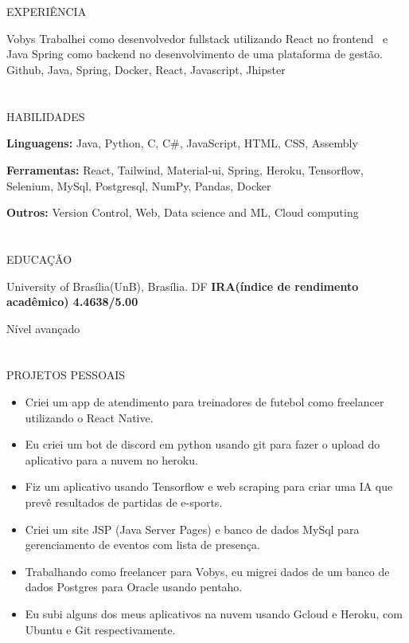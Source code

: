 \documentclass{my_cvPT}
\begin{document}
\begin{multicols}{2}
\section{\faPencil}{EXPERIÊNCIA}
    
%
    {Vobys}%
    {Trabalhei como desenvolvedor fullstack utilizando React no frontend
     \ e Java Spring como backend no desenvolvimento de uma plataforma de gestão.}%
    {Github, Java, Spring, Docker, React, Javascript, Jhipster}
    
\section{\faList}{HABILIDADES}

\textbf{Linguagens:} Java, Python, C, C\#, JavaScript, HTML, CSS, Assembly

\noindent\textbf{Ferramentas:} React, Tailwind, Material-ui, Spring, Heroku, Tensorflow, Selenium, MySql, Postgresql, NumPy, Pandas, Docker

\noindent\textbf{Outros:} Version Control, Web, Data science and ML, Cloud computing

\section{\faGraduationCap}{EDUCAÇÃO}

{University of Brasília(UnB), Brasília. DF} %
{\textbf{IRA(índice de rendimento acadêmico) 4.4638/5.00}}

{Nível avançado} %
{}

\columnbreak

\section{\faPaintBrush}{PROJETOS PESSOAIS}
\begin{itemize}[noitemsep]
    \item Criei um app de atendimento para treinadores de futebol como freelancer utilizando o React Native.
    \item Eu criei um bot de discord em python usando git para fazer o upload do aplicativo para a nuvem no heroku.
    \item Fiz um aplicativo usando Tensorflow e web scraping para criar uma IA que prevê resultados de partidas de e-sports.
    \item Criei um site JSP (Java Server Pages) e banco de dados MySql para gerenciamento de eventos com lista de presença.
    \item Trabalhando como freelancer para Vobys, eu migrei dados de um banco de dados Postgres para
    Oracle usando pentaho.
    \item Eu subi alguns dos meus aplicativos na nuvem usando Gcloud e Heroku, com Ubuntu e Git respectivamente.
\end{itemize}


\end{multicols}
\end{document}
